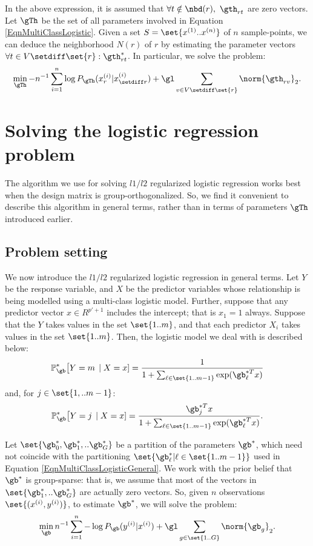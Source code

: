 \documentclass{article}
\begin{document}
In the above expression, it is assumed that $\forall t \notin \nbd(r),\ \gth_{rt}$ are zero vectors. Let $\gTh$ be the set of all parameters involved in Equation \ref{EqnMultiClassLogistic}. Given a set $S = \set{x^{(1)} .. x^{(n)}}$ of $n$ sample-points, we can deduce the neighborhood $N(r)$ of $r$ by estimating the parameter vectors $\forall t \in V \setdiff \set{r}: \gth^*_{r t}$. In particular, we solve the problem:
$$\min_{\gTh} -n^{-1} \sum_{i=1}^{n}\log P_\gTh(x_r^{(i)}|x_{\setdiff r}^{(i)}) + \gl \sum_{v \in V \setdiff \set{r}} \norm{\gth_{rv}}_2.$$

\section{Solving the logistic regression problem}
The algorithm we use for solving $l1/l2$ regularized logistic regression works best when the design matrix is group-orthogonalized. So, we find it convenient to describe this algorithm in general terms, rather than in terms of parameters $\gTh$ introduced earlier.

\subsection{Problem setting}
We now introduce the $l1/l2$ regularized logistic regression in general terms. Let $Y$ be the response variable, and $X$ be the predictor variables whose relationship is being modelled using a multi-class logistic model. Further, suppose that any predictor vector $x \in R^{p' + 1}$ includes the intercept; that is $x_1 = 1$ always. Suppose that the $Y$ takes values in the set $\set{1 .. m}$, and that each predictor $X_i$ takes values in the set $\set{1 .. m}$. Then, the logistic model we deal with is described below:
\begin{equation*}
\mathbb{P}_\gb^{*} \big[Y = m \, \mid X =
x] = \frac{1}{1+\sum_{\ell \in \set{1 .. m-1}}\exp(\gb^{*T}_\ell x)}
\end{equation*}
and, for $j\in \set{1, .. m-1}$:
\begin{equation}
\mathbb{P}_\gb^{*} \big[Y = j \, \mid X =
x] = \frac{\gb^{*T}_jx}{1+\sum_{\ell \in \set{1 .. m-1}}\exp(\gb^{*T}_\ell x)}.
\label{EqnMultiClassLogisticGeneral}
\end{equation}

Let $\set{\gb^{*}_0, \gb^{*}_1, .. \gb^{*}_G}$ be a partition of the parameters $\gb^{*}$, which need not coincide with the partitioning $\set{\gb^{*}_\ell|\ell \in \set{1 .. m-1}}$ used in Equation \ref{EqnMultiClassLogisticGeneral}. We work with the prior belief that $\gb^{*}$ is group-sparse: that is, we assume that most of the vectors in $\set{\gb^{*}_1, .. \gb^{*}_G}$ are actually zero vectors. So, given $n$ observations $\set{(x^{(i)}, y^{(i)})}$, to estimate $\gb^{*}$, we will solve the problem:
$$\min_{\gb} n^{-1} \sum_{i=1}^{n} -\log P_\gb(y^{(i)}|x^{(i)}) + \gl \sum_{g \in \set{1.. G}} \norm{\gb_{g}}_2.$$
\end{document}
